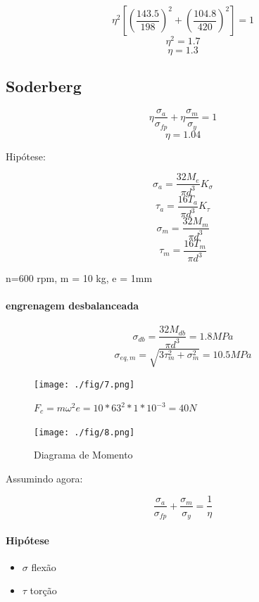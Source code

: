 \documentclass[a4paper, 12pt]{article}
\begin{document}
\[\eta ^{2}[(\frac{143.5}{198})^{2}+(\frac{104.8}{420})^{2}]=1\]
\[\eta^{2}=1.7\]
\[\eta = 1.3\]

\subsection*{Soderberg}

\[\eta\frac{\sigma _{a}}{\sigma _{fp}}+\eta\frac{\sigma _{m}}{\sigma _{y}}=1\]
\[\eta = 1.04\]

Hipótese:

\[\sigma _{a}=\frac{32M_{e}}{\pi d^{3}}K_{\sigma}\]
\[\tau _{a}= \frac{16T_{a}}{\pi d^{3}}K_{\tau}\]
\[\sigma _{m}=\frac{32M_{m}}{\pi d^{3}}\]
\[\tau _{m}= \frac{16T_{m}}{\pi d^{3}}\]

n=600 rpm, m = 10 kg, e = 1mm

\paragraph*{engrenagem desbalanceada}

\[\sigma _{db}=\frac{32M_{db}}{\pi d^{3}}=1.8 MPa\]
\[\sigma _{eq,m}=\sqrt{3\tau _{m}^{2}+\sigma _{m}^{2}}=10.5 MPa\]

\begin{figure}[h]
\begin{center}
\texttt{[image: ./fig/7.png]}
\caption{\label{fig:7}$F_{c}=m\omega ^{2}e=10*63^{2}*1*10^{-3}=40N$} 
\end{center}
\end{figure}

\begin{figure}[h]
\begin{center}
\texttt{[image: ./fig/8.png]}
\caption{\label{fig:8}Diagrama de Momento} 
\end{center}
\end{figure}

\newpage

Assumindo agora:

\[\frac{\sigma _{a}}{\sigma _{fp}}+\frac{\sigma _{m}}{\sigma _{y}}=\frac{1}{\eta}\]

\paragraph*{Hipótese}
\begin{itemize}
\item $\sigma$ flexão
\item $\tau$ torção
\end{itemize}
\end{document}
